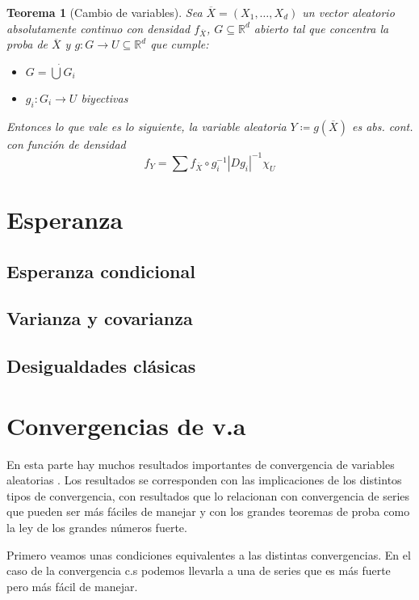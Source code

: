 \documentclass[11pt]{article}
\theoremstyle{plain} %
\newtheorem{teorema}{Teorema}
\theoremstyle{definition}
\theoremstyle{remark}
\def\R{\mathbb{R}}
\def\va{variable aleatoria }
\def\vas{variables aleatorias }
\begin{document}
\begin{teorema}
	[Cambio de variables]
	Sea $\overline{X} = \left( X_1, \dots , X_d \right)$ un vector aleatorio absolutamente continuo con densidad $f_{\overline{X}}$, $G \subseteq \R^d$ abierto tal que concentra la proba de $\overline{X}$ y $g:G \to U \subseteq \R^d$ que cumple:
	\begin{itemize}
		\item $G = \dot{\bigcup} G_i$
		\item  $g_{i}:G_{i} \to U$ biyectivas
	\end{itemize}
	Entonces lo que vale es lo siguiente, la \va $Y \coloneqq g(\overline{X})$ es abs. cont. con función de densidad
	\[f_Y = \sum f_{\overline{X}} \circ g_{i} ^{-1} |Dg_i|^{-1} \chi_U \]
\end{teorema}



\bigskip

\section{Esperanza}

\subsection{Esperanza condicional}

\subsection{Varianza y covarianza}

\subsection{Desigualdades clásicas}

\bigskip
\section{Convergencias de v.a}

En esta parte hay muchos resultados importantes de convergencia de \vas. Los resultados se corresponden con las implicaciones de los distintos tipos de convergencia, con resultados que lo relacionan con convergencia de series que pueden ser más fáciles de manejar y con los grandes teoremas de proba como la ley de los grandes números fuerte.

Primero veamos unas condiciones equivalentes a las distintas convergencias. En el caso de la convergencia c.s podemos llevarla a una de series que es más fuerte pero más fácil de manejar.
\end{document}
